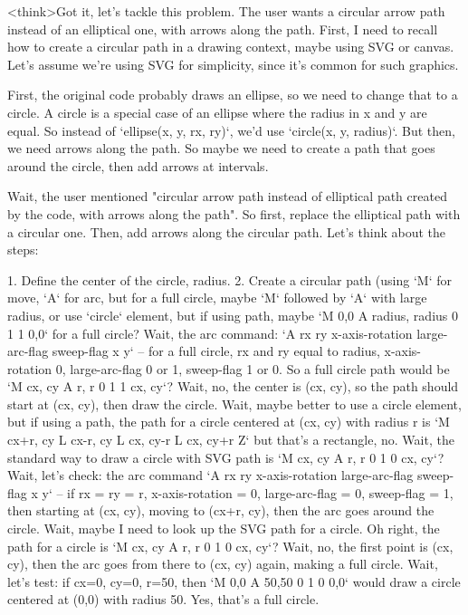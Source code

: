 <think>Got it, let's tackle this problem. The user wants a circular arrow path instead of an elliptical one, with arrows along the path. First, I need to recall how to create a circular path in a drawing context, maybe using SVG or canvas. Let's assume we're using SVG for simplicity, since it's common for such graphics.

First, the original code probably draws an ellipse, so we need to change that to a circle. A circle is a special case of an ellipse where the radius in x and y are equal. So instead of `ellipse(x, y, rx, ry)`, we'd use `circle(x, y, radius)`. But then, we need arrows along the path. So maybe we need to create a path that goes around the circle, then add arrows at intervals.

Wait, the user mentioned "circular arrow path instead of elliptical path created by the code, with arrows along the path". So first, replace the elliptical path with a circular one. Then, add arrows along the circular path. Let's think about the steps:

1. Define the center of the circle, radius.
2. Create a circular path (using `M` for move, `A` for arc, but for a full circle, maybe `M` followed by `A` with large radius, or use `circle` element, but if using path, maybe `M 0,0 A radius, radius 0 1 1 0,0` for a full circle? Wait, the arc command: `A rx ry x-axis-rotation large-arc-flag sweep-flag x y` – for a full circle, rx and ry equal to radius, x-axis-rotation 0, large-arc-flag 0 or 1, sweep-flag 1 or 0. So a full circle path would be `M cx, cy A r, r 0 1 1 cx, cy`? Wait, no, the center is (cx, cy), so the path should start at (cx, cy), then draw the circle. Wait, maybe better to use a circle element, but if using a path, the path for a circle centered at (cx, cy) with radius r is `M cx+r, cy L cx-r, cy L cx, cy-r L cx, cy+r Z` but that's a rectangle, no. Wait, the standard way to draw a circle with SVG path is `M cx, cy A r, r 0 1 0 cx, cy`? Wait, let's check: the arc command `A rx ry x-axis-rotation large-arc-flag sweep-flag x y` – if rx = ry = r, x-axis-rotation = 0, large-arc-flag = 0, sweep-flag = 1, then starting at (cx, cy), moving to (cx+r, cy), then the arc goes around the circle. Wait, maybe I need to look up the SVG path for a circle. Oh right, the path for a circle is `M cx, cy A r, r 0 1 0 cx, cy`? Wait, no, the first point is (cx, cy), then the arc goes from there to (cx, cy) again, making a full circle. Wait, let's test: if cx=0, cy=0, r=50, then `M 0,0 A 50,50 0 1 0 0,0` would draw a circle centered at (0,0) with radius 50. Yes, that's a full circle.

